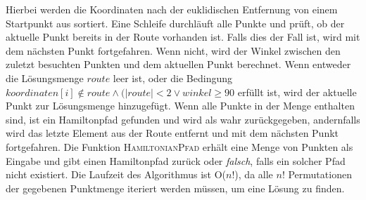 \documentclass[a4paper,10pt,ngerman]{scrartcl}
\begin{document}
    Hierbei werden die Koordinaten nach der euklidischen Entfernung von einem Startpunkt aus sortiert.
    Eine Schleife durchläuft alle Punkte und prüft, ob der aktuelle Punkt bereits in der Route vorhanden ist.
    Falls dies der Fall ist, wird mit dem nächsten Punkt fortgefahren.
    Wenn nicht, wird der Winkel zwischen den zuletzt besuchten Punkten und dem aktuellen Punkt berechnet.
    Wenn entweder die Lösungsmenge $route$ leer ist, oder die Bedingung $\textit{koordinaten}[i] \notin \textit{route} \land (|\textit{route}|<2 \lor \textit{winkel} \geq 90$ erfüllt ist,
    wird der aktuelle Punkt zur Lösungsmenge hinzugefügt.
    Wenn alle Punkte in der Menge enthalten sind, ist ein Hamiltonpfad gefunden und wird als wahr zurückgegeben,
    andernfalls wird das letzte Element aus der Route entfernt und mit dem nächsten Punkt fortgefahren.
    Die Funktion \textsc{HamiltonianPfad} erhält eine Menge von Punkten als Eingabe und gibt einen Hamiltonpfad zurück oder \textit{falsch}, falls ein solcher Pfad nicht existiert.
    Die Laufzeit des Algorithmus ist O($n!$), da alle $n!$ Permutationen der gegebenen Punktmenge iteriert werden müssen, um eine Lösung zu finden.
\end{document}
